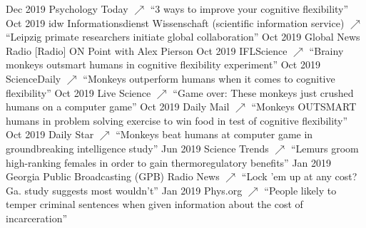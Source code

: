 \documentclass[]{friggeri-cv}
\begin{document}
\begin{entrylist}
  \entry
    {Dec 2019}
    {Psychology Today \href{https://www.psychologytoday.com/us/blog/wild-connections/201912/3-ways-improve-your-cognitive-flexibility}{\small $\nearrow$}}
    {}
    {``3 ways to improve your cognitive flexibility''}
  \entry
    {Oct 2019}
    {idw Informationsdienst Wissenschaft (scientific information service) \href{https://idw-online.de/de/news726094}{\small $\nearrow$}}
    {}
    {``Leipzig primate researchers initiate global collaboration''}
  \entry
    {Oct 2019}
    {Global News Radio}
    {}
    {{[}Radio{]} ON Point with Alex Pierson}
  \entry
    {Oct 2019}
    {IFLScience \href{https://www.iflscience.com/brain/brainy-monkeys-outsmart-humans-in-cognitive-flexibility-experiment/}{\small $\nearrow$}}
    {}
    {``Brainy monkeys outsmart humans in cognitive flexibility experiment''}
  \entry
    {Oct 2019}
    {ScienceDaily \href{https://www.sciencedaily.com/releases/2019/10/191015115356.htm}{\small $\nearrow$}}
    {}
    {``Monkeys outperform humans when it comes to cognitive flexibility''}
  \entry
    {Oct 2019}
    {Live Science \href{https://www.livescience.com/monkeys-outsmart-humans.html}{\small $\nearrow$}}
    {}
    {``Game over: These monkeys just crushed humans on a computer game''}
  \entry
    {Oct 2019}
    {Daily Mail \href{https://www.dailymail.co.uk/sciencetech/article-7585197/Monkeys-OUTSMART-humans-problem-solving-exercise-win-food-test-cognitive-flexibility.html}{\small $\nearrow$}}
    {}
    {``Monkeys OUTSMART humans in problem solving exercise to win food in test of cognitive flexibility''}
  \entry
    {Oct 2019}
    {Daily Star \href{https://www.dailystar.co.uk/news/weird-news/monkeys-beat-humans-computer-game-20642153}{\small $\nearrow$}}
    {}
    {``Monkeys beat humans at computer game in groundbreaking intelligence study''}
  \entry
    {Jun 2019}
    {Science Trends \href{https://sciencetrends.com/lemurs-groom-high-ranking-females-in-order-to-gain-thermoregulatory-benefits/}{\small $\nearrow$}}
    {}
    {``Lemurs groom high-ranking females in order to gain thermoregulatory benefits''}
  \entry
    {Jan 2019}
    {Georgia Public Broadcasting (GPB) Radio News \href{https://www.gpbnews.org/post/lock-em-any-cost-ga-study-suggests-most-wouldnt}{\small $\nearrow$}}
    {}
    {``Lock 'em up at any cost? Ga. study suggests most wouldn't''}
  \entry
    {Jan 2019}
    {Phys.org \href{https://phys.org/news/2019-01-people-temper-criminal-sentences-incarceration.html}{\small $\nearrow$}}
    {}
    {``People likely to temper criminal sentences when given information about the cost of incarceration''}
\end{entrylist}
\end{document}
